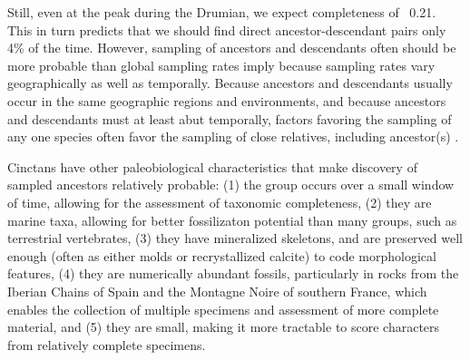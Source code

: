 \documentclass{article}
\begin{document}
Still, even at the peak during the Drumian, we expect completeness of ~0.21. This in turn predicts that we should find direct ancestor-descendant pairs only 4\% of the time.  However, sampling of ancestors and descendants often should be more probable than global sampling rates imply because sampling rates vary geographically as well as temporally. Because ancestors and descendants usually occur in the same geographic regions and environments, and because ancestors and descendants must at least abut temporally, factors favoring the sampling of any one species often favor the sampling of close relatives, including ancestor(s) \citep{WagnerErwin1995}. 

Cinctans have other paleobiological characteristics that make discovery of sampled ancestors relatively probable: (1) the group occurs over a small window of time, allowing for the assessment of taxonomic completeness, (2) they are marine taxa, allowing for better fossilizaton potential than many groups, such as terrestrial vertebrates, (3) they have mineralized skeletons, and are preserved well enough (often as either molds or recrystallized calcite) to code morphological features, (4) they are numerically abundant fossils, particularly in rocks from the Iberian Chains of Spain and the Montagne Noire of southern France, which enables the collection of multiple specimens and assessment of more complete material, and (5) they are small, making it more tractable to score characters from relatively complete specimens.
\end{document}
